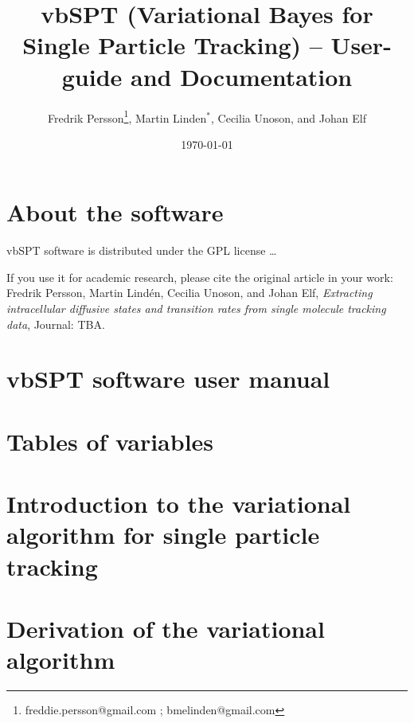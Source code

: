 \documentclass[11pt,letterpaper]{article}
\title{vbSPT (Variational Bayes for Single Particle Tracking) -- User-guide and Documentation}
\author{Fredrik Persson\footnote{freddie.persson@gmail.com ; bmelinden@gmail.com},
Martin Linden$^*$, Cecilia Unoson, and Johan Elf}
\date{\today}
\begin{document}
\maketitle 

\section*{About the software}
vbSPT software is distributed under the GPL license \ldots

If you use it for academic research, please cite the original article
in your work:\medskip\\

\noindent Fredrik Persson, Martin Lind\'en, Cecilia Unoson, and Johan
Elf, \emph{Extracting intracellular diffusive states and transition
  rates from single molecule tracking data}, Journal: TBA.


\tableofcontents
\newpage
\section{vbSPT software user manual}
\label{Sec:userManual}

\newpage
\section{Tables of variables}

\newpage
\section{Introduction to the variational algorithm for single particle tracking}
\label{Sec:statistics}

\section{Derivation of the variational algorithm}
\label{Sec:derivation}


%
% 
%




\newpage



 
\end{document}

